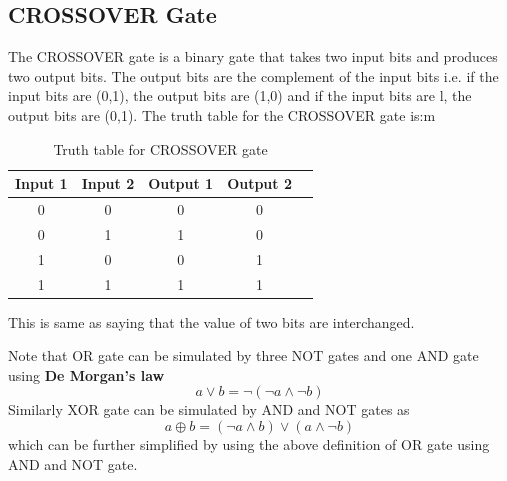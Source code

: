 \documentclass[12pt, oneside]{book}
\theoremstyle{definition}
\theoremstyle{definition}
\theoremstyle{remark}
\begin{document}
\subsection{CROSSOVER Gate}
The CROSSOVER gate is a binary gate that takes two input bits and produces two output bits. The output bits are the complement of the input bits i.e. if the input bits are (0,1), the output bits are (1,0) and if the input bits are l, the output bits are (0,1).
The truth table for the CROSSOVER gate is:m
\begin{table}[H]
\centering
    \begin{tabular}{|c|c|c|c|c|}
        \hline
        Input 1 & Input 2 & Output 1 & Output 2 \\
        \hline
        0 & 0 & 0 & 0 \\
        0 & 1 & 1 & 0 \\
        1 & 0 & 0 & 1 \\
        1 & 1 & 1 & 1 \\
        \hline
    \end{tabular}
    \caption{Truth table for CROSSOVER gate}
    \label{tab:CROSSOVER_GATE}
\end{table}
This is same as saying that the value of two bits are interchanged.

Note that OR gate can be simulated by three NOT gates and one AND gate using \textbf{De Morgan's law}
\[
a\lor b=\neg(\neg a\land \neg b) 
\]
Similarly XOR gate can be simulated by AND and NOT gates as
\[
a \oplus b=(\neg a \land b) \lor (a\land \neg b)
\]
which can be further simplified by using the above definition of OR gate using AND and NOT gate.
\end{document}
